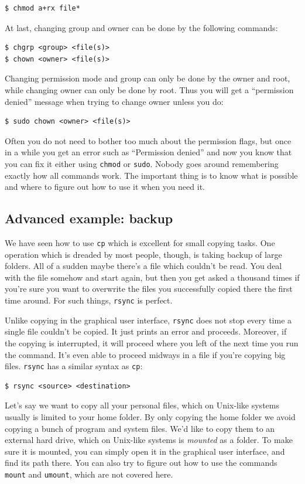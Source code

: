 \begin{verbatim}
$ chmod a+rx file*
\end{verbatim}

At last, changing group and owner can be done by the following commands:

\begin{verbatim}
$ chgrp <group> <file(s)>
$ chown <owner> <file(s)>
\end{verbatim}
Changing permission mode and group can only be done by the owner and root, while changing owner can only be done by root. Thus you will get a ``permission denied'' message when trying to change owner unless you do:

\begin{verbatim}
$ sudo chown <owner> <file(s)>
\end{verbatim}

Often you do not need to bother too much about the permission flags, but once in a while you get an error such as ``Permission denied'' and now you know that you can fix it either using \verb|chmod| or \verb|sudo|. Nobody goes around remembering exactly how all commands work. The important thing is to know what is possible and where to figure out how to use it when you need it.

\subsection{Advanced example: backup}
We have seen how to use \verb|cp| which is excellent for small copying tasks. One operation which is dreaded by most people, though, is taking backup of large folders. All of a sudden maybe there's a file which couldn't be read. You deal with the file somehow and start again, but then you get asked a thousand times if you're sure you want to overwrite the files you successfully copied there the first time around. For such things, \verb|rsync| is perfect.

Unlike copying in the graphical user interface, \verb|rsync| does not stop every time a single file couldn't be copied. It just prints an error and proceeds. Moreover, if the copying is interrupted, it will proceed where you left of the next time you run the command. It's even able to proceed midways in a file if you're copying big files. \verb|rsync| has a similar syntax as \verb|cp|:

\begin{verbatim}
$ rsync <source> <destination>
\end{verbatim}
Let's say we want to copy all your personal files, which on Unix-like systems usually is limited to your home folder. By only copying the home folder we avoid copying a bunch of program and system files. We'd like to copy them to an external hard drive, which on Unix-like systems is \emph{mounted} as a folder. To make sure it is mounted, you can simply open it in the graphical user interface, and find its path there. You can also try to figure out how to use the commands \verb|mount| and \verb|umount|, which are not covered here.

